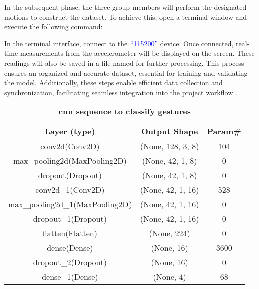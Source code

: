In the subsequent phase, the three group members will perform the designated motions to construct the dataset. To achieve this, open a terminal window and execute the following command:


In the terminal interface, connect to the \textcolor{blue}{``115200''} device. Once connected, real-time measurements from the accelerometer will be displayed on the screen. These readings will also be saved in a file named  for further processing. This process ensures an organized and accurate dataset, essential for training and validating the model. Additionally, these steps enable efficient data collection and synchronization, facilitating seamless integration into the project workflow \cite{Warden:2020}.

%
%
\begin{table}
	\caption{\textbf{\ac{cnn} sequence to classify gestures }}
	\label{Table 7.1}
	\begin{center}
		\begin{tabular}{||c c c||} 
			\hline
			Layer (type) & Output Shape & Param\# \\ [0.5ex] 
			\hline\hline
			conv2d(Conv2D) & (None, 128, 3, 8) & 104 \\ 
			\hline
			max\_pooling2d(MaxPooling2D) & (None, 42, 1, 8) & 0 \\
			\hline
			dropout(Dropout) & (None, 42, 1, 8) & 0  \\
			\hline
			conv2d\_1(Conv2D) & (None, 42, 1, 16) & 528 \\
			\hline
			max\_pooling2d\_1(MaxPooling2D) & (None, 42, 1, 16) & 0 \\  
			\hline
			dropout\_1(Dropout) & (None, 42, 1, 16) & 0  \\
			\hline
			flatten(Flatten) & (None, 224) & 0  \\
			\hline
			dense(Dense) & (None, 16) & 3600  \\  
			\hline
			dropout\_2(Dropout) & (None, 16) & 0  \\
			\hline
			dense\_1(Dense) & (None, 4) & 68  \\ [1ex] 
			\hline
		\end{tabular}
	\end{center}
\end{table}	

